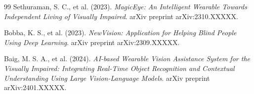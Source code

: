\documentclass[12pt,a4paper]{report}
\begin{document}
\begin{thebibliography}{99}
Sethuraman, S. C., et al. (2023). \textit{MagicEye: An Intelligent Wearable Towards Independent Living of Visually Impaired}. arXiv preprint arXiv:2310.XXXXX.

Bobba, K. S., et al. (2023). \textit{NewVision: Application for Helping Blind People Using Deep Learning}. arXiv preprint arXiv:2309.XXXXX.

Baig, M. S. A., et al. (2024). \textit{AI-based Wearable Vision Assistance System for the Visually Impaired: Integrating Real-Time Object Recognition and Contextual Understanding Using Large Vision-Language Models}. arXiv preprint arXiv:2401.XXXXX.

\end{thebibliography}
\end{document}
